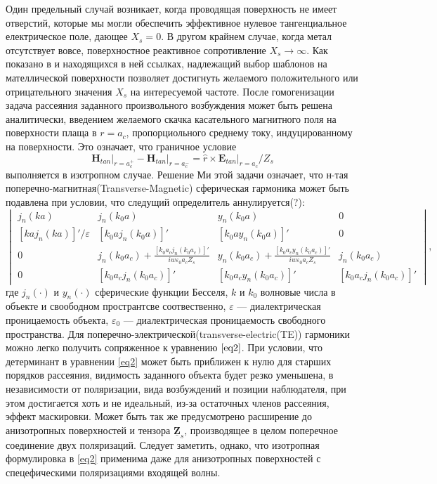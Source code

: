 \documentclass[12pt,a4paper]{article}
\begin{document}
Один предельный случай возникает, когда проводящая поверхность не имеет отверстий, которые мы могли
обеспечить эффективное нулевое тангенциальное електрическое поле, дающее $X_s = 0$. В другом крайнем
случае, когда метал отсутствует вовсе, поверхностное 
реактивное сопротивление $X_s \to \infty$.
Как показано в \cite{14} и находящихся в ней ссылках, надлежащий выбор шаблонов на мателлической
поверхности позволяет достигнуть желаемого положительного или отрицательного значения $X_s$ на 
интересуемой частоте. После гомогенизации задача рассеяния заданного произвольного возбуждения может
быть решена аналитически, введением желаемого скачка касательного магнитного поля на поверхности плаща
в $r=a_c$, пропорциольного среднему току, индуцированному на поверхности. Это означает, что граничное
условие 
\begin{equation}
\left.\textbf{H}_{tan}\right|_{r=a_c^+} - \left.\textbf{H}_{tan}\right|_{r=a_c^-} = 
\hat{r} \times \left.\textbf{E}_{tan}\right|_{r=a_c} / Z_s
\end{equation} 	
выполняется в изотропном случае. Решение Ми этой задачи означает, что н-тая 
поперечно-магнитная(Transverse-Magnetic) сферическая гармоника может быть подавлена при условии,
что следущий определитель аннулируется(?):
\begin{equation}\label{eq2}
\begin{vmatrix}
j_n(ka) & j_n(k_0a) & y_n(k_0a) & 0\\
[kaj_n(ka)]'/\varepsilon & [k_0aj_n(k_0a)]' & [k_0ay_n(k_0a)]' & 0\\
0 & j_n(k_0a_c)+\frac{[k_0a_cj_n(k_0a_c)]'}{iw\varepsilon_0a_cZ_s} &
y_n(k_0a_c) + \frac{[k_0a_cy_n(k_0a_c)]'}{iw\varepsilon_0a_cZ_s} & j_n(k_0a_c)\\
0 & [k_0a_cj_n(k_0a_c)]' & [k_0a_cy_n(k_0a_c)]' & [k_0a_cj_n(k_0a_c)]'
\end{vmatrix},
\end{equation}
где $j_n(\cdot)$ и $y_n(\cdot)$ сферические функции Бесселя, $k$ и $k_0$ волновые числа в объекте и
своободном пространтсве соотвественно, $\varepsilon$ --- диалектрическая проницаемость объекта,
$\varepsilon_0$ --- диалектрическая проницаемость свободного пространства.
Для поперечно-электрической(transverse-electric(TE)) гармоники можно легко 
получить сопряженное к уравнению $\ref{eq2}$. При условии, что детерминант в уравнении 
\ref{eq2} может быть приближен к нулю для старших порядков рассеяния, видимость заданного
объекта будет резко уменьшена, в независимости от поляризации, вида возбуждений и позиции
наблюдателя, при этом достигается хоть и не идеальный, из-за остаточных членов рассеяния,
эффект маскировки. Может быть так же предусмотрено расширение до анизотропных поверхностей
и тензора $\underline{\textbf{Z}}_s$, производящее в целом поперечное соединение двух 
поляризаций. Следует заметить, однако, что изотропная формулировка в \ref{eq2} применима
даже для анизотропных поверхностей с спецефическими поляризациями входящей волны.
\end{document}
